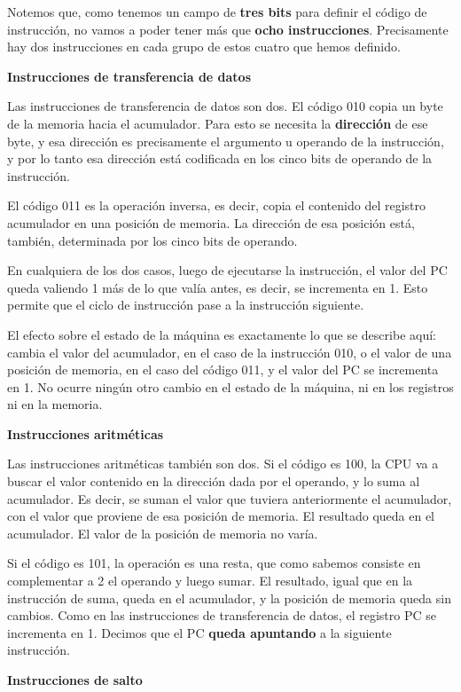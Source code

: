 \documentclass[spanish,A4,]{article}
\begin{document}
Notemos que, como tenemos un campo de \textbf{tres bits} para definir el
código de instrucción, no vamos a poder tener más que \textbf{ocho
instrucciones}. Precisamente hay dos instrucciones en cada grupo de
estos cuatro que hemos definido.

\textbf{Instrucciones de transferencia de datos}

Las instrucciones de transferencia de datos son dos. El código 010 copia
un byte de la memoria hacia el acumulador. Para esto se necesita la
\textbf{dirección} de ese byte, y esa dirección es precisamente el
argumento u operando de la instrucción, y por lo tanto esa dirección
está codificada en los cinco bits de operando de la instrucción.

El código 011 es la operación inversa, es decir, copia el contenido del
registro acumulador en una posición de memoria. La dirección de esa
posición está, también, determinada por los cinco bits de operando.

En cualquiera de los dos casos, luego de ejecutarse la instrucción, el
valor del PC queda valiendo 1 más de lo que valía antes, es decir, se
incrementa en 1. Esto permite que el ciclo de instrucción pase a la
instrucción siguiente.

El efecto sobre el estado de la máquina es exactamente lo que se
describe aquí: cambia el valor del acumulador, en el caso de la
instrucción 010, o el valor de una posición de memoria, en el caso del
código 011, y el valor del PC se incrementa en 1. No ocurre ningún otro
cambio en el estado de la máquina, ni en los registros ni en la memoria.

\textbf{Instrucciones aritméticas}

Las instrucciones aritméticas también son dos. Si el código es 100, la
CPU va a buscar el valor contenido en la dirección dada por el operando,
y lo suma al acumulador. Es decir, se suman el valor que tuviera
anteriormente el acumulador, con el valor que proviene de esa posición
de memoria. El resultado queda en el acumulador. El valor de la posición
de memoria no varía.

Si el código es 101, la operación es una resta, que como sabemos
consiste en complementar a 2 el operando y luego sumar. El resultado,
igual que en la instrucción de suma, queda en el acumulador, y la
posición de memoria queda sin cambios. Como en las instrucciones de
transferencia de datos, el registro PC se incrementa en 1. Decimos que
el PC \textbf{queda apuntando} a la siguiente instrucción.

\textbf{Instrucciones de salto}
\end{document}
